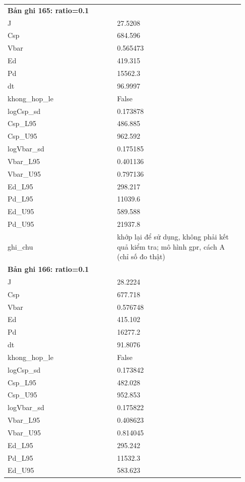 \begin{longtable}{p{0.43\linewidth}p{0.50\linewidth}}
\midrule
\multicolumn{2}{p{0.95\linewidth}}{\textbf{Bản ghi 165: ratio=0.1}} \\
J & 27.5208 \\
Csp & 684.596 \\
Vbar & 0.565473 \\
Ed & 419.315 \\
Pd & 15562.3 \\
dt & 96.9997 \\
khong\_\allowbreak hop\_\allowbreak le & False \\
logCsp\_\allowbreak sd & 0.173878 \\
Csp\_\allowbreak L95 & 486.885 \\
Csp\_\allowbreak U95 & 962.592 \\
logVbar\_\allowbreak sd & 0.175185 \\
Vbar\_\allowbreak L95 & 0.401136 \\
Vbar\_\allowbreak U95 & 0.797136 \\
Ed\_\allowbreak L95 & 298.217 \\
Pd\_\allowbreak L95 & 11039.6 \\
Ed\_\allowbreak U95 & 589.588 \\
Pd\_\allowbreak U95 & 21937.8 \\
ghi\_\allowbreak chu & khớp lại để sử dụng, không phải kết quả kiểm tra; mô hình gpr, cách A (chỉ số đo thật) \\
\midrule
\multicolumn{2}{p{0.95\linewidth}}{\textbf{Bản ghi 166: ratio=0.1}} \\
J & 28.2224 \\
Csp & 677.718 \\
Vbar & 0.576748 \\
Ed & 415.102 \\
Pd & 16277.2 \\
dt & 91.8076 \\
khong\_\allowbreak hop\_\allowbreak le & False \\
logCsp\_\allowbreak sd & 0.173842 \\
Csp\_\allowbreak L95 & 482.028 \\
Csp\_\allowbreak U95 & 952.853 \\
logVbar\_\allowbreak sd & 0.175822 \\
Vbar\_\allowbreak L95 & 0.408623 \\
Vbar\_\allowbreak U95 & 0.814045 \\
Ed\_\allowbreak L95 & 295.242 \\
Pd\_\allowbreak L95 & 11532.3 \\
Ed\_\allowbreak U95 & 583.623 \\

\end{longtable}
